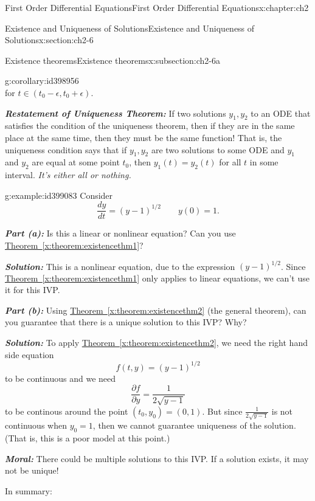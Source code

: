 \documentclass[oneside,10pt,]{book}
\newcommand{\xreffont}{\relax}
\newcommand{\alert}[1]{\textbf{\textit{#1}}}
\numberwithin{equation}{section}
\numberwithin{equation}{section}
\begin{document}
\begin{chapterptx}{First Order Differential Equations}{}{First Order Differential Equations}{}{}{x:chapter:ch2}
\begin{sectionptx}{Existence and Uniqueness of Solutions}{}{Existence and Uniqueness of Solutions}{}{}{x:section:ch2-6}
\begin{subsectionptx}{Existence theorems}{}{Existence theorems}{}{}{x:subsection:ch2-6a}
\begin{corollary}{}{}{g:corollary:id398956}
\begin{equation*}
\end{equation*}
for \(t\in\left(t_{0}-\epsilon,t_{0}+\epsilon\right)\).%
\end{corollary}
\alert{Restatement of Uniqueness Theorem:} If two solutions \(y_{1},y_{2}\) to an ODE that satisfies the condition of the uniqueness theorem, then if they are in the same place at the same time, then they must be the same function! That is, the uniqueness condition says that if \(y_{1},y_{2}\) are two solutions to some ODE and \(y_{1}\) and \(y_{2}\) are equal at some point \(t_{0}\), then \(y_{1}(t)=y_{2}(t)\) for all \(t\) in some interval. \emph{It's either all or nothing.}%
\begin{example}{}{g:example:id399083}%
Consider%
\begin{equation*}
\frac{dy}{dt}=(y-1)^{1/2}\qquad y(0)=1.
\end{equation*}
%
\par
\alert{Part (a):} Is this a linear or nonlinear equation? Can you use \hyperref[x:theorem:existencethm1]{Theorem~{\xreffont\ref{x:theorem:existencethm1}}}?%
\par
\alert{Solution:} This is a nonlinear equation, due to the expression \((y-1)^{1/2}\). Since \hyperref[x:theorem:existencethm1]{Theorem~{\xreffont\ref{x:theorem:existencethm1}}} only applies to linear equations, we can't use it for this IVP.%
\par
\alert{Part (b):} Using \hyperref[x:theorem:existencethm2]{Theorem~{\xreffont\ref{x:theorem:existencethm2}}} (the general theorem), can you guarantee that there is a unique solution to this IVP? Why?%
\par
\alert{Solution:} To apply \hyperref[x:theorem:existencethm2]{Theorem~{\xreffont\ref{x:theorem:existencethm2}}}, we need the right hand side equation%
\begin{equation*}
f(t,y)=(y-1)^{1/2}
\end{equation*}
to be continuous and we need%
\begin{equation*}
\frac{\partial f}{\partial y}=\frac{1}{2\sqrt{y-1}}
\end{equation*}
to be continous around the point \((t_{0},y_{0})=(0,1)\). But since \(\frac{1}{2\sqrt{y-1}}\) is not continuous when \(y_{0}=1\), then we cannot guarantee uniqueness of the solution. (That is, this is a poor model at this point.)%
\par
\alert{Moral:} There could be multiple solutions to this IVP. If a solution exists, it may not be unique!%
\end{example}
In summary:%

\end{subsectionptx}
\end{sectionptx}
\end{chapterptx}
\end{document}
